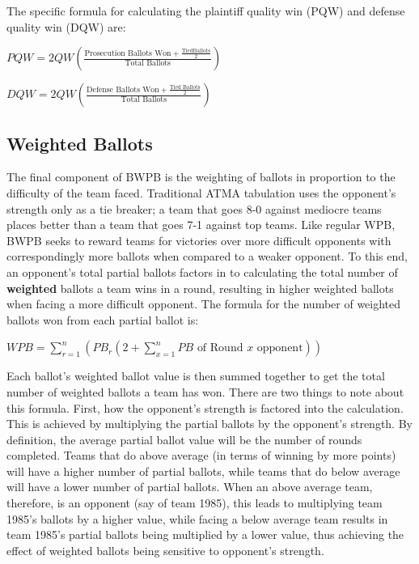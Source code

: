\documentclass{article}
\begin{document}
The specific formula for calculating the plaintiff quality win (PQW) and defense quality win (DQW) are:
\begin{center}
$PQW=2QW\left(\frac{\mbox{Prosecution Ballots Won}+\frac{\mbox{TiedBallots}}{2}}{\mbox{Total Ballots}}\right)$

$DQW=2QW\left(\frac{\mbox{Defense Ballots Won}+\frac{\mbox{Tied Ballots}}{2}}{\mbox{Total Ballots}}\right)$
\end{center}

\subsection{Weighted Ballots}
The final component of BWPB is the weighting of ballots in proportion to the difficulty of the team faced.  Traditional ATMA tabulation uses the opponent's strength only as a tie breaker; a team that goes 8-0 against mediocre teams places better than a team that goes 7-1 against top teams.  Like regular WPB, BWPB seeks to reward teams for victories over more difficult opponents with correspondingly more ballots when compared to a weaker opponent.  To this end, an opponent's total partial ballots factors in to calculating the total number of \textbf{weighted} ballots a team wins in a round, resulting in higher weighted ballots when facing a more difficult opponent.  The formula for the number of weighted ballots won from each partial ballot is:

\begin{center}$WPB=\sum\limits_{r=1}^{n} \left(PB_{r}\left(2+\sum\limits_{x=1}^{n}\mbox{$PB$ of Round $x$ opponent}\right)\right)$\end{center}

Each ballot's weighted ballot value is then summed together to get the total number of weighted ballots a team has won.  There are two things to note about this formula.  First, how the opponent's strength is factored into the calculation.  This is achieved by multiplying the partial ballots by the opponent's strength.  By definition, the average partial ballot value will be the number of rounds completed.  Teams that do above average (in terms of winning by more points) will have a higher number of partial ballots, while teams that do below average will have a lower number of partial ballots.  When an above average team, therefore, is an opponent (say of team 1985), this leads to multiplying team 1985's ballots by a higher value, while facing a below average team results in team 1985's partial ballots being multiplied by a lower value, thus achieving the effect of weighted ballots being sensitive to opponent's strength.
\end{document}
